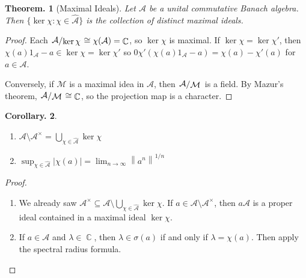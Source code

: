 \documentclass[11pt, a4paper]{memoir}
\DeclareMathOperator{\C}{{\mathbb{C}}}
\newcommand{\norm}[1]{\ensuremath{\left\lVert#1\right\rVert}}
\theoremstyle{change}
\newtheorem{theorem}{Theorem.}[section]
\newtheorem{corollary}[theorem]{Corollary.}
\theoremstyle{plain}
\theoremstyle{nonumberplain}
\newtheorem{proof}{Proof}
\newcommand{\quot}[2]{\mathchoice{\left.\raisebox{0.14em}{$#1$}\middle/\raisebox{-0.14em}{$#2$}\right.}
                                 {\left.\raisebox{0.08em}{$#1$}\middle/\raisebox{-0.08em}{$#2$}\right.}
                                 {\left.\raisebox{0.03em}{$#1$}\middle/\raisebox{-0.03em}{$#2$}\right.}
                                 {\left.\raisebox{0em}{$#1$}\middle/\raisebox{0em}{$#2$}\right.}}
\numberwithin{equation}{section}
\begin{document}
\begin{theorem}[Maximal Ideals]
    Let $\mathcal{A}$ be a unital commutative Banach algebra.
    Then $\{\ker\chi:\chi\in\hat{\mathcal{A}}\}$ is the collection of distinct maximal ideals.
\end{theorem}
\begin{proof}
    Each $\quot{\mathcal{A}}{\ker\chi}\cong\chi(\mathcal{A})=\C$, so $\ker\chi$ is maximal.
    If $\ker\chi=\ker\chi'$, then $\chi(a)1_{\mathcal{A}}-a\in\ker\chi=\ker\chi'$ so $0\chi'(\chi(a)1_{\mathcal{A}}-a)=\chi(a)-\chi'(a)$ for $a\in\mathcal{A}$.

    Conversely, if $\mathcal{M}$ is a maximal idea in $\mathcal{A}$, then $\quot{\mathcal{A}}{\mathcal{M}}$ is a field.
    By Mazur's theorem, $\quot{\mathcal{A}}{\mathcal{M}}\cong\C$, so the projection map is a character.
\end{proof}
\begin{corollary}
    \begin{enumerate}[nl,r]
        \item $\mathcal{A}\setminus\mathcal{A}^\times=\bigcup_{\chi\in\hat{\mathcal{A}}}\ker\chi$
        \item $\sup_{\chi\in\hat{\mathcal{A}}}|\chi(a)|=\lim_{n\to\infty}\norm{a^n}^{1/n}$
    \end{enumerate}
\end{corollary}
\begin{proof}
    \begin{enumerate}[nl,r]
        \item We already saw $\mathcal{A}^\times\subseteq\mathcal{A}\setminus\bigcup_{\chi\in\hat{\mathcal{A}}}\ker\chi$.
            If $a\in\mathcal{A}\setminus\mathcal{A}^\times$, then $a\mathcal{A}$ is a proper ideal contained in a maximal ideal $\ker\chi$.
        \item If $a\in\mathcal{A}$ and $\lambda\in\C$, then $\lambda\in\sigma(a)$ if and only if $\lambda=\chi(a)$.
            Then apply the spectral radius formula.
    \end{enumerate}
\end{proof}
\end{document}
